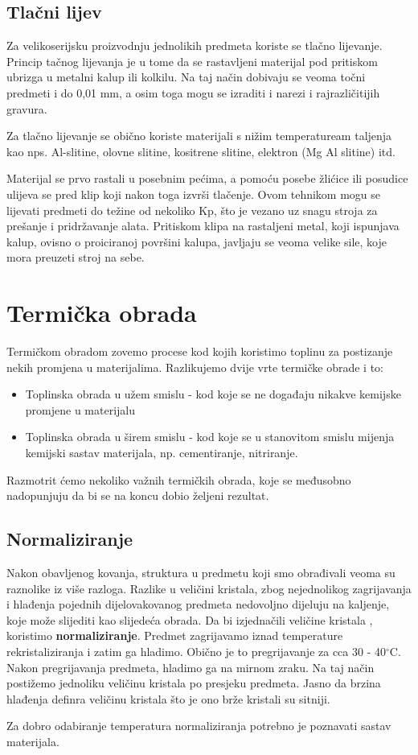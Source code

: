 \documentclass[a4paper,12pt]{article}
\numberwithin{figure}{section}
\begin{document}
\subsection{Tlačni lijev}
Za velikoserijsku proizvodnju jednolikih predmeta koriste se tlačno lijevanje. Princip tačnog lijevanja je u tome da se rastavljeni materijal pod pritiskom ubrizga u metalni kalup ili kolkilu. Na taj način dobivaju se veoma točni predmeti  i do 0,01 mm, a osim toga mogu se izraditi i narezi i rajrazličitijih gravura. \par 
Za tlačno lijevanje se obično koriste materijali s nižim temperatuream taljenja kao nps. Al-slitine, olovne slitine, kositrene slitine, elektron (Mg Al slitine) itd.\par 
Materijal se prvo rastali u posebnim pećima, a pomoću posebe žlićice ili posudice ulijeva se pred klip koji nakon toga izvrši tlačenje. Ovom tehnikom mogu se lijevati predmeti do težine od nekoliko Kp, što je vezano uz snagu stroja za prešanje i pridržavanje alata. Pritiskom klipa na rastaljeni metal, koji ispunjava kalup, ovisno o proiciranoj površini kalupa, javljaju se veoma velike sile, koje mora preuzeti stroj na sebe.
\section{Termička obrada}
Termičkom obradom zovemo procese kod kojih koristimo toplinu za postizanje nekih promjena u materijalima. Razlikujemo dvije vrte termičke obrade i to:
\begin{itemize}
\item Toplinska obrada u užem smislu - kod koje se ne događaju nikakve kemijske promjene u materijalu
\item Toplinska obrada u širem smislu - kod koje se u stanovitom smislu mijenja kemijski sastav materijala, np. cementiranje, nitriranje.
\end{itemize}
Razmotrit ćemo nekoliko važnih termičkih obrada, koje se međusobno nadopunjuju da bi se na koncu dobio željeni rezultat.
\subsection{Normaliziranje}
Nakon obavljenog kovanja, struktura u predmetu koji smo obrađivali veoma su raznolike iz više razloga. Razlike u veličini kristala, zbog nejednolikog zagrijavanja i hlađenja pojednih dijelovakovanog predmeta nedovoljno dijeluju na kaljenje, koje može slijediti kao slijedeća obrada. Da bi izjednačili veličine kristala , koristimo \textbf{normaliziranje}. Predmet zagrijavamo iznad temperature rekristaliziranja i zatim ga hladimo. Obično je to pregrijavanje za cca 30 - 40$^{\circ}$C. Nakon pregrijavanja predmeta, hladimo ga na mirnom zraku. Na taj način postižemo jednoliku veličinu kristala po presjeku predmeta. Jasno da brzina hlađenja definra veličinu kristala što je ono brže kristali su sitniji. \par
Za dobro odabiranje temperatura normaliziranja potrebno je poznavati sastav materijala.
\end{document}
